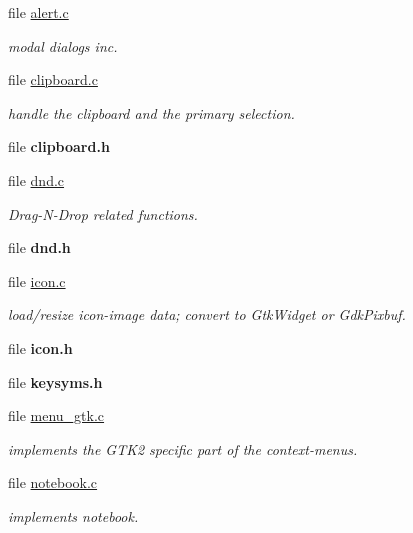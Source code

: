 \begin{CompactItemize}
\item 
file \hyperlink{alert_8c}{alert.c}
\begin{CompactList}\small\item\em modal dialogs inc. \item\end{CompactList}

\item 
file \hyperlink{clipboard_8c}{clipboard.c}
\begin{CompactList}\small\item\em handle the clipboard and the primary selection. \item\end{CompactList}

\item 
file {\bf clipboard.h}
\item 
file \hyperlink{dnd_8c}{dnd.c}
\begin{CompactList}\small\item\em Drag-N-Drop related functions. \item\end{CompactList}

\item 
file {\bf dnd.h}
\item 
file \hyperlink{icon_8c}{icon.c}
\begin{CompactList}\small\item\em load/resize icon-image data; convert to Gtk\-Widget or Gdk\-Pixbuf. \item\end{CompactList}

\item 
file {\bf icon.h}
\item 
file {\bf keysyms.h}
\item 
file \hyperlink{menu__gtk_8c}{menu\_\-gtk.c}
\begin{CompactList}\small\item\em implements the GTK2 specific part of the context-menus. \item\end{CompactList}

\item 
file \hyperlink{notebook_8c}{notebook.c}
\begin{CompactList}\small\item\em implements notebook. \item\end{CompactList}


\end{CompactItemize}
